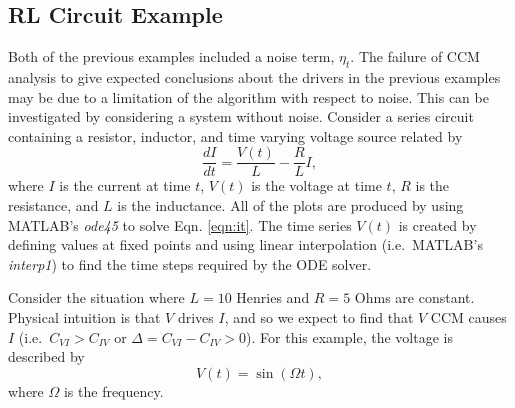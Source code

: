 \documentclass[twocolumn,aps,pre,groupedaddress]{revtex4-1}
\begin{document}
\subsection{RL Circuit Example}
\label{sec:rlcirc}
Both of the previous examples included a noise term, $\eta_t$.  The failure of CCM analysis to give expected conclusions about the drivers in the previous examples may be due to a limitation of the algorithm with respect to noise.  This can be investigated by considering a system without noise.  Consider a series circuit containing a resistor, inductor, and time varying voltage source related by
\begin{equation}
\label{eqn:it}
\frac{dI}{dt} = \frac{V(t)}{L} - \frac{R}{L} I,
\end{equation}
where $I$ is the current at time $t$, $V(t)$ is the voltage at time $t$, $R$ is the resistance, and $L$ is the inductance.  All of the plots are produced by using MATLAB's {\em ode45} to solve Eqn. \ref{eqn:it}.  The time series $V(t)$ is created by defining values at fixed points and using linear interpolation (i.e.\ MATLAB's {\em interp1}) to find the time steps required by the ODE solver.  

Consider the situation where $L=10$ Henries and $R=5$ Ohms are constant.  Physical intuition is that $V$ drives $I$, and so we expect to find that $V$ CCM causes $I$ (i.e.\ $C_{VI}>C_{IV}$ or $\Delta = C_{VI}-C_{IV} > 0$).  For this example, the voltage is described by 
\begin{equation}
\label{eqn:vt}
V(t) = \sin\left(\Omega t\right),
\end{equation}
where $\Omega$ is the frequency.
\end{document}
